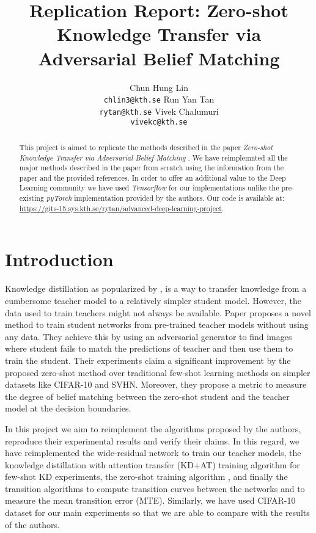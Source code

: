 \documentclass{article}
\title{Replication Report: Zero-shot Knowledge Transfer via Adversarial Belief Matching}
\author{
  Chun Hung Lin \\
  \texttt{chlin3@kth.se}
  \And
  Run Yan Tan \\
  \texttt{rytan@kth.se}
  \And
  Vivek Chalumuri \\
  \texttt{vivekc@kth.se}
}
\begin{document}

\maketitle

\begin{abstract}

  This project is aimed to replicate the methods described in the paper \textit{Zero-shot Knowledge Transfer via Adversarial Belief Matching} \cite{micaelli2019zero}. We have reimplemnted all the major methods described in the paper from scratch using the information from the paper and the provided references. In order to offer an additional value to the Deep Learning community we have used \textit{Tensorflow} for our implementations unlike the pre-existing \textit{pyTorch} implementation provided by the authors. Our code  is available at: \url{https://gits-15.sys.kth.se/rytan/advanced-deep-learning-project}.

\end{abstract}

\section{Introduction}

Knowledge distillation as popularized by \cite{hinton2015distilling},  is a way to transfer knowledge from a cumbersome teacher model to a relatively simpler student model. However, the data used to train teachers might not always be available. Paper \cite{micaelli2019zero} proposes a novel method to train student networks from pre-trained teacher models without using any data. They achieve this by using an adversarial generator to find images where student fails to match the predictions of teacher and then use them to train the student. Their experiments claim a significant improvement by the proposed zero-shot method over traditional few-shot learning methods on simpler datasets like CIFAR-10 and SVHN. Moreover, they propose a metric to measure the degree of belief matching between the zero-shot student and the teacher model at the decision boundaries.

In this project we aim to reimplement the algorithms proposed by the authors, reproduce their experimental results and verify their claims. In this regard, we have reimplemented the wide-residual network \cite{zagoruyko2016wide} to train our teacher models, the knowledge distillation with attention transfer (KD+AT) training algorithm \cite{micaelli2019zero} for few-shot KD experiments, the zero-shot training algorithm \cite{micaelli2019zero}, and finally the transition algorithms \cite{micaelli2019zero} to compute transition curves between the networks and to measure the mean transition error (MTE). Similarly, we have used CIFAR-10 dataset for our main experiments so that we are able to compare with the results of the authors.
\end{document}
